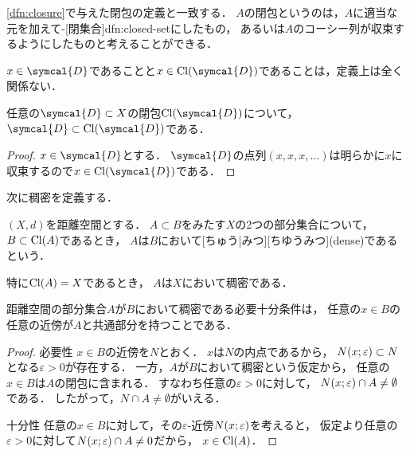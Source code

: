 \documentclass[../sotsu.tex]{subfiles}
\begin{document}
\cref{dfn:closure}で与えた閉包の定義と一致する．
$A$の閉包というのは，$A$に適当な元を加えて-[閉集合]{dfn:closed-set}にしたもの，
あるいは$A$のコーシー列が収束するようにしたものと考えることができる．

$x \in \symcal{D}$であることと$x \in \cl{\symcal{D}}$であることは，定義上は全く関係ない．

\begin{corollary}
    任意の$\symcal{D} \subset X$の閉包$\cl{\symcal{D}}$について，
    $\symcal{D} \subset \cl{\symcal{D}}$である．
\end{corollary}

\begin{proof}
    $x \in \symcal{D}$とする．
    $\symcal{D}$の点列$(x, x, x, \dotsc)$は明らかに$x$に収束するので$x \in \cl{\symcal{D}}$である．
\end{proof}

次に稠密を定義する．

\begin{definition}[稠密]
    \label{dfn:dense}
    $(X, d)$を距離空間とする．
    $A \subset B$をみたす$X$の2つの部分集合について，
    $B \subset \mathrm{Cl}(A)$であるとき，
    $A$は$B$において[ちゅう|みつ][ちゆうみつ](dense)であるという\cite{iwanami-functional}．

    特に$\mathrm{Cl}(A) = X$であるとき，
    $A$は$X$において稠密である．
\end{definition}

\begin{proposition}
    距離空間の部分集合$A$が$B$において稠密である必要十分条件は，
    任意の$x \in B$の任意の近傍が$A$と共通部分を持つことである\cite{iwanami-functional}．
\end{proposition}

\begin{proof}
    \textsf{必要性} \quad 
    $x \in B$の近傍を$N$とおく．
    $x$は$N$の内点であるから，
    $N(x; \varepsilon) \subset N$となる$\varepsilon > 0$が存在する．
    一方，$A$が$B$において稠密という仮定から，
    任意の$x \in B$は$A$の閉包に含まれる．
    すなわち任意の$\varepsilon > 0$に対して，
    $N(x; \varepsilon) \cap A \neq \emptyset$である．
    したがって，$N \cap A \neq \emptyset$がいえる．

    \textsf{十分性} \quad 
    任意の$x \in B$に対して，その$\varepsilon$-近傍$N(x; \varepsilon)$を考えると，
    仮定より任意の$\varepsilon > 0$に対して$N(x; \varepsilon) \cap A \neq 0$だから，
    $x \in \mathrm{Cl}(A)$．
\end{proof}
\end{document}
